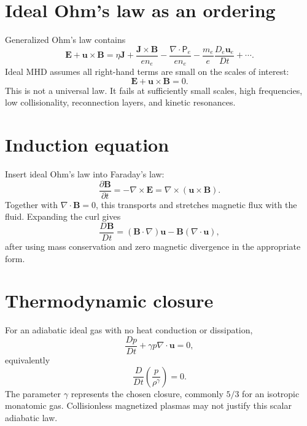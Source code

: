 \documentclass[11pt]{article}
\begin{document}
\section{Ideal Ohm's law as an ordering}

Generalized Ohm's law contains
\begin{equation}
\mathbf E+\mathbf u\times\mathbf B
=\eta\mathbf J+\frac{\mathbf J\times\mathbf B}{en_e}
-\frac{\nabla\cdot\mathsf P_e}{en_e}
-\frac{m_e}{e}\frac{D_e\mathbf u_e}{Dt}+\cdots.
\end{equation}
Ideal MHD assumes all right-hand terms are small on the scales of interest:
\begin{equation}
\boxed{\mathbf E+\mathbf u\times\mathbf B=0}.
\end{equation}
This is not a universal law. It fails at sufficiently small scales, high frequencies, low collisionality, reconnection layers, and kinetic resonances.


\section{Induction equation}

Insert ideal Ohm's law into Faraday's law:
\begin{equation}
\frac{\partial\mathbf B}{\partial t}
=-\nabla\times\mathbf E
=\nabla\times(\mathbf u\times\mathbf B).
\end{equation}
Together with $\nabla\cdot\mathbf B=0$, this transports and stretches magnetic flux with the fluid. Expanding the curl gives
\begin{equation}
\frac{D\mathbf B}{Dt}
=(\mathbf B\cdot\nabla)\mathbf u
-\mathbf B(\nabla\cdot\mathbf u),
\end{equation}
after using mass conservation and zero magnetic divergence in the appropriate form.


\section{Thermodynamic closure}

For an adiabatic ideal gas with no heat conduction or dissipation,
\begin{equation}
\frac{Dp}{Dt}+\gamma p\nabla\cdot\mathbf u=0,
\end{equation}
equivalently
\begin{equation}
\frac{D}{Dt}\left(\frac{p}{\rho^\gamma}\right)=0.
\end{equation}
The parameter $\gamma$ represents the chosen closure, commonly $5/3$ for an isotropic monatomic gas. Collisionless magnetized plasmas may not justify this scalar adiabatic law.
\end{document}
